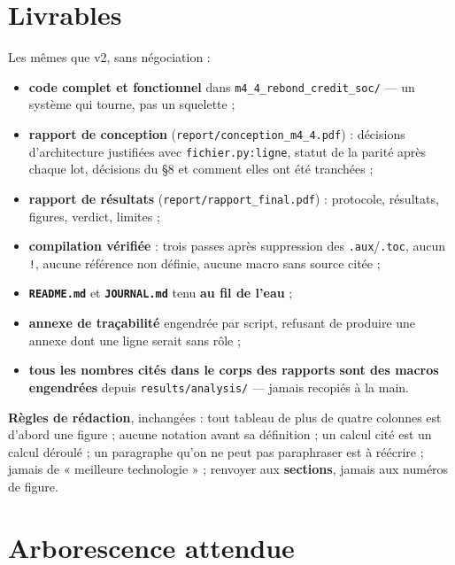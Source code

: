 \documentclass[11pt,a4paper]{article}
\newcommand{\code}[1]{\texttt{#1}}
\begin{document}
\bigskip

\setcounter{section}{9}
\section{Livrables}

Les mêmes que v2, sans négociation :

\begin{itemize}
\item \textbf{code complet et fonctionnel} dans \code{m4\_4\_rebond\_credit\_soc/} --- un système qui tourne, pas un squelette ;
\item \textbf{rapport de conception} (\code{report/conception\_m4\_4.pdf}) : décisions d'architecture justifiées avec \code{fichier.py:ligne}, statut de la parité après chaque lot, décisions du §8 et comment elles ont été tranchées ;
\item \textbf{rapport de résultats} (\code{report/rapport\_final.pdf}) : protocole, résultats, figures, verdict, limites ;
\item \textbf{compilation vérifiée} : trois passes après suppression des \code{.aux}/\code{.toc}, aucun \code{!}, aucune référence non définie, aucune macro sans source citée ;
\item \textbf{\code{README.md}} et \textbf{\code{JOURNAL.md}} tenu \textbf{au fil de l'eau} ;
\item \textbf{annexe de traçabilité} engendrée par script, refusant de produire une annexe dont une ligne serait sans rôle ;
\item \textbf{tous les nombres cités dans le corps des rapports sont des macros engendrées} depuis \code{results/analysis/} --- jamais recopiés à la main.
\end{itemize}

\textbf{Règles de rédaction}, inchangées : tout tableau de plus de quatre colonnes est d'abord une figure ; aucune notation avant sa définition ; un calcul cité est un calcul déroulé ; un paragraphe qu'on ne peut pas paraphraser est à réécrire ; jamais de « meilleure technologie » ; renvoyer aux \textbf{sections}, jamais aux numéros de figure.

\bigskip

\setcounter{section}{10}
\section{Arborescence attendue}
\end{document}
